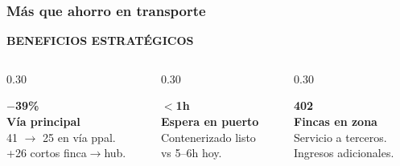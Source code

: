 \documentclass[aspectratio=169, 10pt]{beamer}
\newcommand{\tagline}[2]{{\scriptsize\color{#1}\textbf{\MakeUppercase{#2}}}}
\begin{document}
\begin{frame}
\frametitle{M\'as que ahorro en transporte}
\tagline{azul}{Beneficios Estrat\'egicos}
\vspace{-2pt}

\begin{columns}[T]
\begin{column}{0.30\textwidth}
\colorbox{verdeclaro}{\parbox{\dimexpr\linewidth-8pt}{\scriptsize\strut
\textcolor{verde}{\textbf{\Large $-$39\%}}\\[2pt]
\textbf{V\'ia principal}\\[3pt]
41 $\rightarrow$ 25 en v\'ia ppal.\\
+26 cortos finca$\rightarrow$hub.\strut}}
\end{column}
\begin{column}{0.30\textwidth}
\colorbox{azulclaro}{\parbox{\dimexpr\linewidth-8pt}{\scriptsize\strut
\textcolor{azul}{\textbf{\Large $<$1h}}\\[2pt]
\textbf{Espera en puerto}\\[3pt]
Contenerizado listo\\
vs 5--6h hoy.\strut}}
\end{column}
\begin{column}{0.30\textwidth}
\colorbox{amarilloclaro}{\parbox{\dimexpr\linewidth-8pt}{\scriptsize\strut
\textcolor{amarillo}{\textbf{\Large 402}}\\[2pt]
\textbf{Fincas en zona}\\[3pt]
Servicio a terceros.\\
Ingresos adicionales.\strut}}
\end{column}
\end{columns}


\end{frame}
\end{document}
